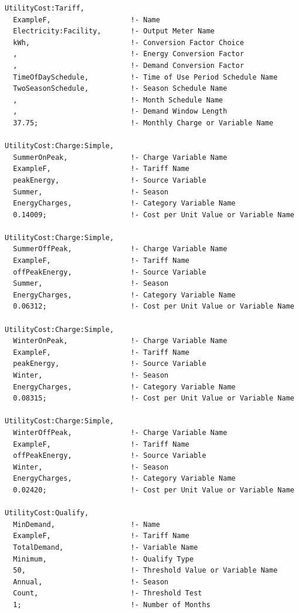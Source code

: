 \begin{lstlisting}
UtilityCost:Tariff,
  ExampleF,                   !- Name
  Electricity:Facility,       !- Output Meter Name
  kWh,                        !- Conversion Factor Choice
  ,                           !- Energy Conversion Factor
  ,                           !- Demand Conversion Factor
  TimeOfDaySchedule,          !- Time of Use Period Schedule Name
  TwoSeasonSchedule,          !- Season Schedule Name
  ,                           !- Month Schedule Name
  ,                           !- Demand Window Length
  37.75;                      !- Monthly Charge or Variable Name

UtilityCost:Charge:Simple,
  SummerOnPeak,               !- Charge Variable Name
  ExampleF,                   !- Tariff Name
  peakEnergy,                 !- Source Variable
  Summer,                     !- Season
  EnergyCharges,              !- Category Variable Name
  0.14009;                    !- Cost per Unit Value or Variable Name

UtilityCost:Charge:Simple,
  SummerOffPeak,              !- Charge Variable Name
  ExampleF,                   !- Tariff Name
  offPeakEnergy,              !- Source Variable
  Summer,                     !- Season
  EnergyCharges,              !- Category Variable Name
  0.06312;                    !- Cost per Unit Value or Variable Name

UtilityCost:Charge:Simple,
  WinterOnPeak,               !- Charge Variable Name
  ExampleF,                   !- Tariff Name
  peakEnergy,                 !- Source Variable
  Winter,                     !- Season
  EnergyCharges,              !- Category Variable Name
  0.08315;                    !- Cost per Unit Value or Variable Name

UtilityCost:Charge:Simple,
  WinterOffPeak,              !- Charge Variable Name
  ExampleF,                   !- Tariff Name
  offPeakEnergy,              !- Source Variable
  Winter,                     !- Season
  EnergyCharges,              !- Category Variable Name
  0.02420;                    !- Cost per Unit Value or Variable Name

UtilityCost:Qualify,
  MinDemand,                  !- Name
  ExampleF,                   !- Tariff Name
  TotalDemand,                !- Variable Name
  Minimum,                    !- Qualify Type
  50,                         !- Threshold Value or Variable Name
  Annual,                     !- Season
  Count,                      !- Threshold Test
  1;                          !- Number of Months


\end{lstlisting}
